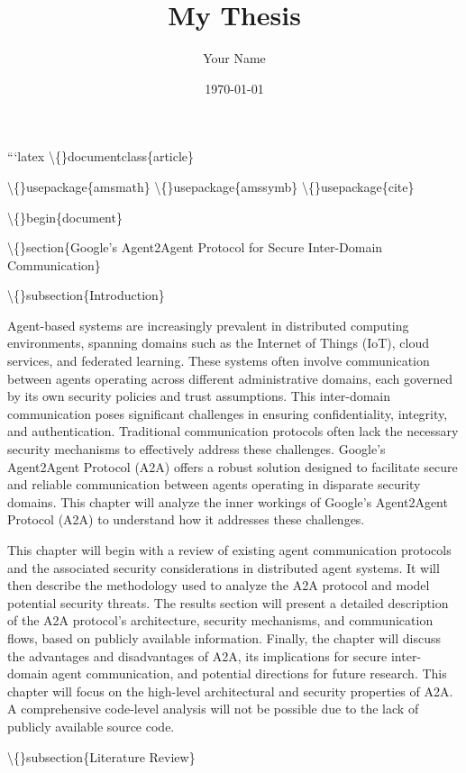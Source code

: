 \documentclass{article}
\title{My Thesis}
\author{Your Name}
\date{\today}
\begin{document}
\maketitle

```latex
\textbackslash\{\}documentclass\{article\}

\textbackslash\{\}usepackage\{amsmath\}
\textbackslash\{\}usepackage\{amssymb\}
\textbackslash\{\}usepackage\{cite\}

\textbackslash\{\}begin\{document\}

\textbackslash\{\}section\{Google's Agent2Agent Protocol for Secure Inter-Domain Communication\}

\textbackslash\{\}subsection\{Introduction\}

Agent-based systems are increasingly prevalent in distributed computing environments, spanning domains such as the Internet of Things (IoT), cloud services, and federated learning. These systems often involve communication between agents operating across different administrative domains, each governed by its own security policies and trust assumptions. This inter-domain communication poses significant challenges in ensuring confidentiality, integrity, and authentication. Traditional communication protocols often lack the necessary security mechanisms to effectively address these challenges. Google's Agent2Agent Protocol (A2A) offers a robust solution designed to facilitate secure and reliable communication between agents operating in disparate security domains. This chapter will analyze the inner workings of Google's Agent2Agent Protocol (A2A) to understand how it addresses these challenges.

This chapter will begin with a review of existing agent communication protocols and the associated security considerations in distributed agent systems. It will then describe the methodology used to analyze the A2A protocol and model potential security threats. The results section will present a detailed description of the A2A protocol's architecture, security mechanisms, and communication flows, based on publicly available information. Finally, the chapter will discuss the advantages and disadvantages of A2A, its implications for secure inter-domain agent communication, and potential directions for future research. This chapter will focus on the high-level architectural and security properties of A2A. A comprehensive code-level analysis will not be possible due to the lack of publicly available source code.

\textbackslash\{\}subsection\{Literature Review\}
\end{document}
